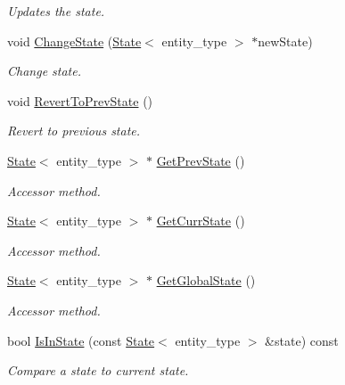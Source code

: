 \begin{CompactItemize}
\begin{CompactList}\small\item\em Updates the state. \item\end{CompactList}\item 
void \hyperlink{class_state_machine_916699645fd8deb8f0d757825d300d01}{ChangeState} (\hyperlink{class_state}{State}$<$ entity\_\-type $>$ $\ast$newState)
\begin{CompactList}\small\item\em Change state. \item\end{CompactList}\item 
void \hyperlink{class_state_machine_93ba40368fa2e9d4985f1bb0c1b7e55a}{RevertToPrevState} ()
\begin{CompactList}\small\item\em Revert to previous state. \item\end{CompactList}\item 
\hyperlink{class_state}{State}$<$ entity\_\-type $>$ $\ast$ \hyperlink{class_state_machine_b319631fb8ea7e6f27f301631b1e1aab}{GetPrevState} ()
\begin{CompactList}\small\item\em Accessor method. \item\end{CompactList}\item 
\hyperlink{class_state}{State}$<$ entity\_\-type $>$ $\ast$ \hyperlink{class_state_machine_ac6d93ae87626985bdd2c831c36fd110}{GetCurrState} ()
\begin{CompactList}\small\item\em Accessor method. \item\end{CompactList}\item 
\hyperlink{class_state}{State}$<$ entity\_\-type $>$ $\ast$ \hyperlink{class_state_machine_35d0fd48873e42d21b309c1bfa7f83a3}{GetGlobalState} ()
\begin{CompactList}\small\item\em Accessor method. \item\end{CompactList}\item 
bool \hyperlink{class_state_machine_cc3b506f626a27632bebbdae15276650}{IsInState} (const \hyperlink{class_state}{State}$<$ entity\_\-type $>$ \&state) const 
\begin{CompactList}\small\item\em Compare a state to current state. \item\end{CompactList}\end{CompactItemize}


